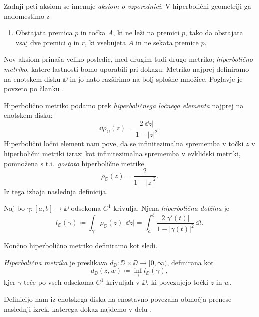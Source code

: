 \noindent Zadnji peti aksiom se imenuje \emph{aksiom o vzporednici}. V hiperbolični geometriji ga nadomestimo z

\begin{enumerate}[resume]
    \item[5'.] Obstajata premica \(p\) in točka \(A\), ki ne leži na premici \(p\), tako da obstajata vsaj dve premici \(q\) in \(r\), ki vsebujeta \(A\) in ne sekata premice \(p\).
\end{enumerate}

\noindent Nov aksiom prinaša veliko posledic, med drugim tudi drugo metriko; \emph{hiperbolično metriko}, katere lastnosti bomo uporabili pri dokazu. Metriko najprej definiramo na enotskem disku \(\DD\) in jo nato razširimo na bolj splošne množice. Poglavje je povzeto po članku \cite[razdelek 3]{Shen_2015}.

Hiperbolično metriko podamo prek \emph{hiperboličnega ločnega elementa} najprej na enotskem disku:
\[\dd \rho_{\DD} (z) = \frac{2 |\dd z|}{1 - |z|^2}.\]
Hiperbolični ločni element nam pove, da se infinitezimalna sprememba v točki \(z\) v hiperbolični metriki izrazi kot infinitezimalna sprememba v evklidski metriki, pomnožena s t.i.~\emph{gostoto} hiperbolične metrike
\[\rho_{\DD} (z) = \frac{2}{1 - |z|^2}.\]
Iz tega izhaja naslednja definicija.

\begin{definicija}
    Naj bo \(\gamma \colon [a, b] \to \DD\) odsekoma \(C^1\) krivulja. Njena \emph{hiperbolična dolžina} je
    \[l_{\DD} (\gamma) \coloneq \int_{\gamma} \rho_{\DD} (z) \, | \dd z | = \int_{a}^{b} \frac{2 | \gamma' (t) | }{1 - | \gamma (t) |^2} \, \dd t.\]
\end{definicija}

\noindent Končno hiperbolično metriko definiramo kot sledi.

\begin{definicija}
    \emph{Hiperbolična metrika} je preslikava \(d_{\DD} \colon \DD \times \DD \to [0, \infty)\), definirana kot
    \[d_{\DD} (z, w) \coloneq \inf_{\gamma} l_{\DD} (\gamma),\]
    kjer \(\gamma\) teče po vseh odsekoma \(C^1\) krivuljah v \(\DD\), ki povezujejo točki \(z\) in \(w\).
\end{definicija}

Definicijo nam iz enotskega diska na enostavno povezana območja prenese naslednji izrek, katerega dokaz najdemo v delu \cite[izrek 6.4]{Beardon_2006}.

